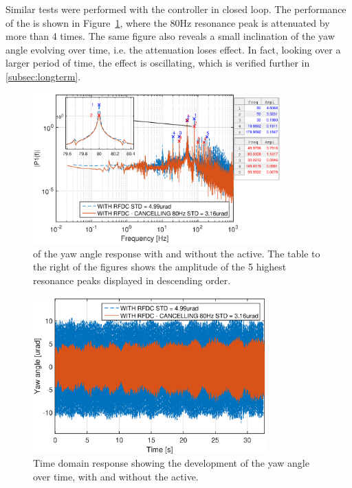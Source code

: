 Similar tests were performed with the controller in closed loop. The performance of the \abbrRFDC is shown in Figure~\ref{fig:fft_closedloop_80}, where the 80Hz resonance peak is attenuated by more than 4 times. The same figure also reveals a small inclination of the yaw angle evolving over time, i.e. the attenuation loses effect. In fact, looking over a larger period of time, the effect is oscillating, which is verified further in \ref{subsec:longterm}.

\begin{figure}[h]
  \centering %
  \includegraphics[width=0.85\textwidth]{fig/matlab/fft_closedloop_ext_disturbance_80Hz_with_zoom_2}
  \caption{\label{fig:fft_closedloop_80} \abbrFFT of the yaw angle response with and without the \abbrRFDC active. The table to the right of the figures shows the amplitude of the 5 highest resonance peaks displayed in descending order.}
\end{figure}

\begin{figure}[h]
  \centering %
  \includegraphics[width=0.8\textwidth]{fig/matlab/yl_closedloop_ext_disturbance_80Hz_2}
  \caption{\label{fig:yl_closedloop_80} Time domain response showing the development of the yaw angle over time, with and without the \abbrRFDC active.}
\end{figure}

